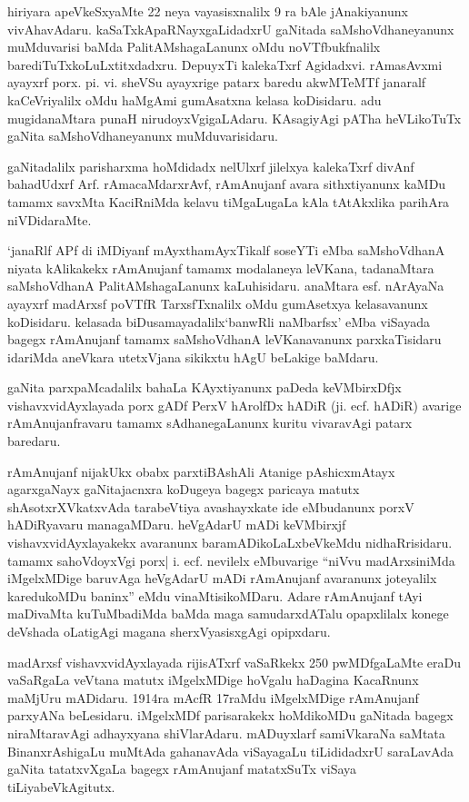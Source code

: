 hiriyara apeVkeSxyaMte {\rm 22} neya vayasisxnalilx {\rm 9} ra bAle jAnakiyanunx vivAha\-vAdaru. kaSaTxkApaRNayxgaLidadxrU gaNitada saMshoVdhaneyanunx muMduvarisi baMda PalitAMshagaLanunx oMdu noVTfbukfnalilx  barediTuTxkoLuLxtitxdadxru. DepuyxTi kalekaTxrf Agidadx\break vi. rAmasAvxmi ayayxrf porx. pi. vi. sheVSu ayayxrige patarx baredu akwMTeMTf janaralf kaCeVriyalilx oMdu haMgAmi gumAsatxna kelasa koDisidaru. adu mugida\break naMtara punaH nirudoyxVgigaLAdaru. KAsagiyAgi pATha heVLikoTuTx gaNita saMshoVdhane\-yanunx muMduvarisidaru.

gaNitadalilx parisharxma hoMdidadx nelUlxrf jilelxya kalekaTxrf divAnf bahadUdxrf Arf. rAmacaMdarxrAvf, rAmAnujanf avara sithxtiyanunx kaMDu tamamx savxMta KaciRniMda kelavu tiMgaLugaLa kAla tAtAkxlika parihAra niVDidaraMte.

`janaRlf APf di iMDiyanf mAyxthamAyxTikalf soseYTi eMba saMshoV\-dhanA niyata kAlikakekx rAmAnujanf tamamx modalaneya leVKana, tadanaMtara saMshoV\-dhanA PalitAMshagaLanunx kaLuhisidaru. anaMtara esf. nArAyaNa ayayxrf madArxsf poVTfR TarxsfTxnalilx oMdu gumAsetxya kelasavanunx koDisidaru. kelasada biDusamayadalilx\break  `banwRli naMbarfsx' eMba viSayada bagegx rAmAnujanf tamamx saMshoVdhanA leVKanavanunx parxkaTisidaru idariMda aneVkara utetxVjana sikikxtu hAgU beLakige baMdaru.

gaNita parxpaMcadalilx bahaLa KAyxtiyanunx paDeda keVMbirxDfjx vishavxvidAyxlayada porx gADf PerxV hArolfDx hADiR (ji. ecf. hADiR) avarige rAmAnujanfravaru tamamx sAdhanegaLanunx kuritu vivaravAgi patarx baredaru.

rAmAnujanf nijakUkx obabx parxtiBAshAli Atanige pAshicxmAtayx agarxgaNayx gaNitajacnxra koDugeya bagegx paricaya matutx shAsotxrXVkatxvAda tarabeVtiya avashayxkate ide eMbu\-danunx porxV hADiRyavaru managaMDaru. heVgAdarU mADi keVMbirxjf vishavxvidAyxlayakekx avaranunx baramADikoLaLxbeVkeMdu nidhaRrisidaru. tamamx sahoVdoyxVgi porx| i. ecf. nevilelx eMbuvarige ``niVvu madArxsiniMda iMgelxMDige baruvAga heVgAdarU mADi rAmA\-nujanf avaranunx joteyalilx karedukoMDu baninx'' eMdu vinaMtisikoMDaru. Adare rAmAnujanf tAyi maDivaMta kuTuMbadiMda baMda maga samudarxdATalu opapxlilalx konege deVshada oLatigAgi magana sherxVyasisxgAgi opipxdaru.

madArxsf vishavxvidAyxlayada rijisATxrf vaSaRkekx {\rm 250} pwMDfgaLaMte eraDu vaSaRgaLa veVtana matutx iMgelxMDige hoVgalu haDagina KacaRnunx maMjUru mADidaru.  {\rm 1914}ra mAcfR {\rm 17}raMdu iMgelxMDige rAmAnujanf parxyANa beLesidaru. iMgelxMDf parisarakekx hoMdikoMDu gaNitada bagegx niraMtaravAgi adhayxyana shiVlarAdaru. mADuyx\-larf samiVkaraNa saMtata BinanxrAshigaLu muMtAda gahanavAda viSayagaLu tiLididadxrU saraLavAda gaNita tatatxvXgaLa bagegx rAmAnujanf matatxSuTx viSaya tiLiyabeVkAgitutx.


